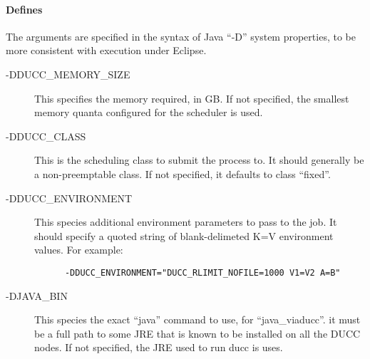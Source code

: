      \paragraph{Defines}

     The arguments are specified in the syntax of Java ``-D'' system properties, to be more consistent
     with execution under Eclipse.
     \begin{description}
         \item[-DDUCC\_MEMORY\_SIZE] This specifies the memory required, in GB.  If not specified, the
           smallest memory quanta configured for the scheduler is used.
         \item[-DDUCC\_CLASS] This is the scheduling class to submit the process to.  It should generally
           be a non-preemptable class.  If not specified, it defaults to class ``fixed''.
         \item[-DDUCC\_ENVIRONMENT] This species additional environment parameters to pass to the job.
           It should specify a quoted string of blank-delimeted K=V environment values.  For example:
\begin{verbatim}
      -DDUCC_ENVIRONMENT="DUCC_RLIMIT_NOFILE=1000 V1=V2 A=B"
\end{verbatim}
         \item[-DJAVA\_BIN] This species the exact ``java'' command to use, for ``java\_viaducc''.  it
           must be a full path to some JRE that is known to be installed on all the DUCC nodes.  If not
           specified, the JRE used to run ducc is uses.
    \end{description}
        
